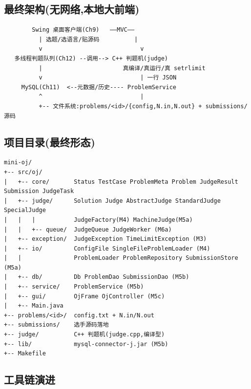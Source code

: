 \documentclass[
  11pt,
]{ctexart}
\begin{document}
\hypertarget{ux6700ux7ec8ux67b6ux6784ux65e0ux7f51ux7edcux672cux5730ux5927ux524dux7aef}{%
\subsection{最终架构(无网络,本地大前端)}\label{ux6700ux7ec8ux67b6ux6784ux65e0ux7f51ux7edcux672cux5730ux5927ux524dux7aef}}

\begin{verbatim}
        Swing 桌面客户端(Ch9)   ——MVC——
          | 选题/选语言/贴源码          |
          v                            v
   多线程判题队列(Ch12) --调用--> C++ 判题机(judge)
          |                       真编译/真运行/真 setrlimit
          v                            | 一行 JSON
     MySQL(Ch11)  <--元数据/历史---- ProblemService
          ^                            |
          +-- 文件系统:problems/<id>/{config,N.in,N.out} + submissions/ 源码
\end{verbatim}

\hypertarget{ux9879ux76eeux76eeux5f55ux6700ux7ec8ux5f62ux6001}{%
\subsection{项目目录(最终形态)}\label{ux9879ux76eeux76eeux5f55ux6700ux7ec8ux5f62ux6001}}

\begin{verbatim}
mini-oj/
+-- src/oj/
|   +-- core/       Status TestCase ProblemMeta Problem JudgeResult Submission JudgeTask
|   +-- judge/      Solution Judge AbstractJudge StandardJudge SpecialJudge
|   |   |           JudgeFactory(M4) MachineJudge(M5a)
|   |   +-- queue/  JudgeQueue JudgeWorker (M6a)
|   +-- exception/  JudgeException TimeLimitException (M3)
|   +-- io/         ConfigFile SingleFileProblemLoader (M4)
|   |               ProblemLoader ProblemRepository SubmissionStore (M5a)
|   +-- db/         Db ProblemDao SubmissionDao (M5b)
|   +-- service/    ProblemService (M5b)
|   +-- gui/        OjFrame OjController (M5c)
|   +-- Main.java
+-- problems/<id>/  config.txt + N.in/N.out
+-- submissions/    选手源码落地
+-- judge/          C++ 判题机(judge.cpp,编译型)
+-- lib/            mysql-connector-j.jar (M5b)
+-- Makefile
\end{verbatim}

\hypertarget{ux5de5ux5177ux94feux6f14ux8fdb}{%
\subsection{工具链演进}\label{ux5de5ux5177ux94feux6f14ux8fdb}}
\end{document}
